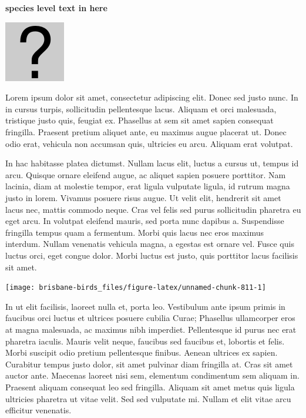 \documentclass[]{book}
\let\origfigure\figure
\let\endorigfigure\endfigure
\renewenvironment{figure}[1][2] {
  \expandafter\origfigure\expandafter[H]
} {
  \endorigfigure
}
\begin{document}
\textbf{species level text in here}

\begin{figure}
\centering
\includegraphics{assets/missing.png}
\caption{No image for species}
\end{figure}

Lorem ipsum dolor sit amet, consectetur adipiscing elit. Donec sed justo
nunc. In in cursus turpis, sollicitudin pellentesque lacus. Aliquam et
orci malesuada, tristique justo quis, feugiat ex. Phasellus at sem sit
amet sapien consequat fringilla. Praesent pretium aliquet ante, eu
maximus augue placerat ut. Donec odio erat, vehicula non accumsan quis,
ultricies eu arcu. Aliquam erat volutpat.

In hac habitasse platea dictumst. Nullam lacus elit, luctus a cursus ut,
tempus id arcu. Quisque ornare eleifend augue, ac aliquet sapien posuere
porttitor. Nam lacinia, diam at molestie tempor, erat ligula vulputate
ligula, id rutrum magna justo in lorem. Vivamus posuere risus augue. Ut
velit elit, hendrerit sit amet lacus nec, mattis commodo neque. Cras vel
felis sed purus sollicitudin pharetra eu eget arcu. In volutpat eleifend
mauris, sed porta nunc dapibus a. Suspendisse fringilla tempus quam a
fermentum. Morbi quis lacus nec eros maximus interdum. Nullam venenatis
vehicula magna, a egestas est ornare vel. Fusce quis luctus orci, eget
congue dolor. Morbi luctus est justo, quis porttitor lacus facilisis sit
amet.

\begin{figure}
\texttt{[image: brisbane-birds\_files/figure-latex/unnamed-chunk-811-1]} \caption{insert figure caption}\label{fig:unnamed-chunk-811}
\end{figure}

In ut elit facilisis, laoreet nulla et, porta leo. Vestibulum ante ipsum
primis in faucibus orci luctus et ultrices posuere cubilia Curae;
Phasellus ullamcorper eros at magna malesuada, ac maximus nibh
imperdiet. Pellentesque id purus nec erat pharetra iaculis. Mauris velit
neque, faucibus sed faucibus et, lobortis et felis. Morbi suscipit odio
pretium pellentesque finibus. Aenean ultrices ex sapien. Curabitur
tempus justo dolor, sit amet pulvinar diam fringilla at. Cras sit amet
auctor ante. Maecenas laoreet nisi sem, elementum condimentum sem
aliquam in. Praesent aliquam consequat leo sed fringilla. Aliquam sit
amet metus quis ligula ultricies pharetra ut vitae velit. Sed sed
vulputate mi. Nullam et elit vitae arcu efficitur venenatis.
\end{document}
